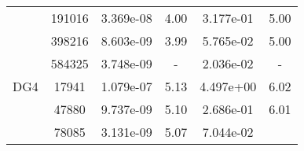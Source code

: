 \begin{table}
\begin{center}
{\begin{tabular}{| l | c | c | c | c | c |}
            &191016
            
                &3.369e-08
                
                &4.00
                
                &3.177e-01
                
                &5.00\\
                
            &398216
            
                &8.603e-09
                
                &3.99
                
                &5.765e-02
                
                &5.00\\
                
            &584325
            
                &3.748e-09
                
                &-
                
                &2.036e-02
                
                &-\\
                \hline
        \hline
        \hspace{0.1cm}DG4\hspace{0.1cm}    
        
            &17941
            
                &1.079e-07
                
                &5.13
                
                &4.497e+00
                
                &6.02\\
                
            &47880
            
                &9.737e-09
                
                &5.10
                
                &2.686e-01
                
                &6.01\\
                
            &78085
            
                &3.131e-09
                
                &5.07
                
                &7.044e-02
                

\end{tabular}}
\end{center}
\end{table}
